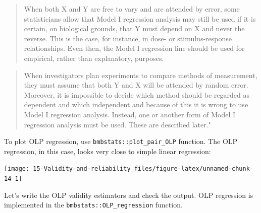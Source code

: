 \documentclass[
]{book}
\newenvironment{Shaded}{\begin{snugshade}}{\end{snugshade}}
\newcommand{\DataTypeTok}[1]{\textcolor[rgb]{0.13,0.29,0.53}{#1}}
\newcommand{\FloatTok}[1]{\textcolor[rgb]{0.00,0.00,0.81}{#1}}
\newcommand{\KeywordTok}[1]{\textcolor[rgb]{0.13,0.29,0.53}{\textbf{#1}}}
\newcommand{\NormalTok}[1]{#1}
\newcommand{\OperatorTok}[1]{\textcolor[rgb]{0.81,0.36,0.00}{\textbf{#1}}}
\newcommand{\StringTok}[1]{\textcolor[rgb]{0.31,0.60,0.02}{#1}}
\begin{document}
\begin{quote}
When both X and Y are free to vary and are attended by error, some statisticians allow that Model I regression analysis may still be used if it is certain, on biological grounds, that Y must depend on X and never the reverse. This is the case, for instance, in dose- or stimulus-response relationships. Even then, the Model I regression line should be used for empirical, rather than explanatory, purposes.
\end{quote}

\begin{quote}
When investigators plan experiments to compare methods of measurement, they must assume that both Y and X will be attended by random error. Moreover, it is impossible to decide which method should be regarded as dependent and which independent and because of this it is wrong to use Model I regression analysis. Instead, one or another form of Model I regression analysis must be used. These are described later."
\end{quote}

To plot OLP regression, use \texttt{bmbstats::plot\_pair\_OLP} function. The OLP regression, in this case, looks very close to simple linear regression:

\begin{Shaded}
\end{Shaded}

\begin{center}\texttt{[image: 15-Validity-and-reliability\_files/figure-latex/unnamed-chunk-14-1]} \end{center}

Let's write the OLP validity estimators and check the output. OLP regression is implemented in the \texttt{bmbstats::OLP\_regression} function.
\end{document}
